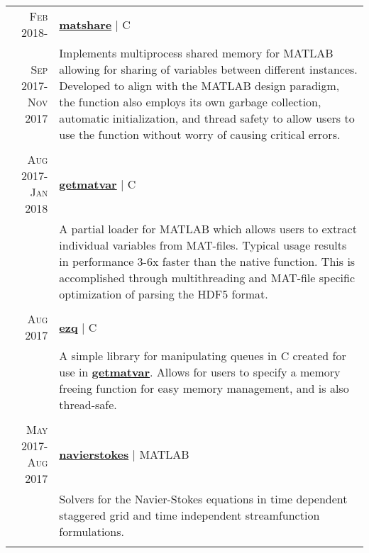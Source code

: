 \documentclass[letter,10pt]{article} %
\begin{document}
\begin{tabular}{r|p{9.5cm}}
\textsc{Feb} 2018-\hphantom{\textsc{Mar} 2018} & \textbf{\href{https://github.com/gharveymn/matshare}{\color{black}matshare}} | C \\ 
\textsc{Sep} 2017-\textsc{Nov} 2017 & \footnotesize{Implements multiprocess shared memory for MATLAB allowing for sharing of variables between different instances. Developed to align with the MATLAB design paradigm, the function also employs its own garbage collection, automatic initialization, and thread safety to allow users to use the function without worry of causing critical errors.}\\
\multicolumn{2}{c}{} \vspace{-1ex}\\


\textsc{Aug} 2017-\textsc{Jan} 2018 & \textbf{\href{https://github.com/gharveymn/getmatvar}{\color{black}getmatvar}} | C \\
& \footnotesize{A partial loader for MATLAB which allows users to extract individual variables from MAT-files. Typical usage results in performance 3-6x faster than the native function. This is accomplished through multithreading and MAT-file specific optimization of parsing the HDF5 format.}\\
\multicolumn{2}{c}{} \vspace{-1ex}\\


\textsc{Aug} 2017 & \textbf{\textbf{\href{https://github.com/gharveymn/ezq}{\color{black}ezq}}} | C \\
& \footnotesize{A simple library for manipulating queues in C created for use in \textbf{\href{https://github.com/gharveymn/getmatvar}{\color{black}getmatvar}}. Allows for users to specify a memory freeing function for easy memory management, and is also thread-safe.} \\
\multicolumn{2}{c}{} \vspace{-1ex}\\


\textsc{May} 2017-\textsc{Aug} 2017 & \textbf{\href{https://github.com/gharveymn/navierstokes}{\color{black}navierstokes}} | MATLAB \\
& \footnotesize{Solvers for the Navier-Stokes equations in time dependent staggered grid and time independent streamfunction formulations.}\\
\multicolumn{2}{c}{} \vspace{-1ex}\\


\end{tabular}
\end{document}
